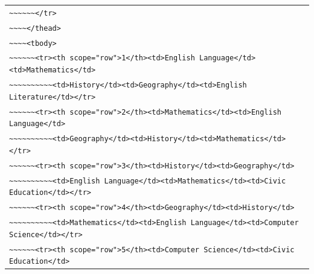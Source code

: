 \documentclass[11pt]{article}
\begin{document}
\begin{center}
\begin{tabular}{l}
\texttt{\textasciitilde{}\textasciitilde{}\textasciitilde{}\textasciitilde{}\textasciitilde{}\textasciitilde{}</tr>} \\
\texttt{\textasciitilde{}\textasciitilde{}\textasciitilde{}\textasciitilde{}</thead>} \\
\texttt{\textasciitilde{}\textasciitilde{}\textasciitilde{}\textasciitilde{}<tbody>} \\
\texttt{\textasciitilde{}\textasciitilde{}\textasciitilde{}\textasciitilde{}\textasciitilde{}\textasciitilde{}<tr><th scope="row">1</th><td>English Language</td><td>Mathematics</td>} \\
\texttt{\textasciitilde{}\textasciitilde{}\textasciitilde{}\textasciitilde{}\textasciitilde{}\textasciitilde{}\textasciitilde{}\textasciitilde{}\textasciitilde{}\textasciitilde{}<td>History</td><td>Geography</td><td>English Literature</td></tr>} \\
\texttt{\textasciitilde{}\textasciitilde{}\textasciitilde{}\textasciitilde{}\textasciitilde{}\textasciitilde{}<tr><th scope="row">2</th><td>Mathematics</td><td>English Language</td>} \\
\texttt{\textasciitilde{}\textasciitilde{}\textasciitilde{}\textasciitilde{}\textasciitilde{}\textasciitilde{}\textasciitilde{}\textasciitilde{}\textasciitilde{}\textasciitilde{}<td>Geography</td><td>History</td><td>Mathematics</td></tr>} \\
\texttt{\textasciitilde{}\textasciitilde{}\textasciitilde{}\textasciitilde{}\textasciitilde{}\textasciitilde{}<tr><th scope="row">3</th><td>History</td><td>Geography</td>} \\
\texttt{\textasciitilde{}\textasciitilde{}\textasciitilde{}\textasciitilde{}\textasciitilde{}\textasciitilde{}\textasciitilde{}\textasciitilde{}\textasciitilde{}\textasciitilde{}<td>English Language</td><td>Mathematics</td><td>Civic Education</td></tr>} \\
\texttt{\textasciitilde{}\textasciitilde{}\textasciitilde{}\textasciitilde{}\textasciitilde{}\textasciitilde{}<tr><th scope="row">4</th><td>Geography</td><td>History</td>} \\
\texttt{\textasciitilde{}\textasciitilde{}\textasciitilde{}\textasciitilde{}\textasciitilde{}\textasciitilde{}\textasciitilde{}\textasciitilde{}\textasciitilde{}\textasciitilde{}<td>Mathematics</td><td>English Language</td><td>Computer Science</td></tr>} \\
\texttt{\textasciitilde{}\textasciitilde{}\textasciitilde{}\textasciitilde{}\textasciitilde{}\textasciitilde{}<tr><th scope="row">5</th><td>Computer Science</td><td>Civic Education</td>} \\

\end{tabular}
\end{center}
\end{document}
